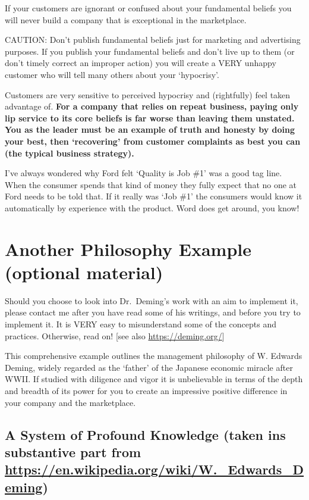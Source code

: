 \documentclass[
]{book}
\begin{document}
If your customers are ignorant or confused about your fundamental beliefs you will never build a company that is exceptional in the marketplace.

{CAUTION}: Don't publish fundamental beliefs just for marketing and advertising purposes. If you publish your fundamental beliefs and don't live up to them (or don't timely correct an improper action) you will create a VERY unhappy customer who will tell many others about your `hypocrisy'.

Customers are very sensitive to perceived hypocrisy and (rightfully) feel taken advantage of. \textbf{For a company that relies on repeat business, paying only lip service to its core beliefs is far worse than leaving them unstated. You as the leader must be an example of truth and honesty by doing your best, then `recovering' from customer complaints as best you can (the typical business strategy).}

I've always wondered why Ford felt `Quality is Job \#1' was a good tag line. When the consumer spends that kind of money they fully expect that no one at Ford needs to be told that. If it really was `Job \#1' the consumers would know it automatically by experience with the product. Word does get around, you know!

\hypertarget{another-philosophy-example-optional-material}{%
\section{Another Philosophy Example (optional material)}\label{another-philosophy-example-optional-material}}

Should you choose to look into Dr.~Deming's work with an aim to implement it, please contact me after you have read some of his writings, and before you try to implement it. It is VERY easy to misunderstand some of the concepts and practices. Otherwise, read on! {[}see also \url{https://deming.org/}{]}

This comprehensive example outlines the management philosophy of W. Edwards Deming, widely regarded as the `father' of the Japanese economic miracle after WWII. If studied with diligence and vigor it is unbelievable in terms of the depth and breadth of its power for you to create an impressive positive difference in your company and the marketplace.

\hypertarget{a-system-of-profound-knowledge-taken-ins-substantive-part-from-httpsen.wikipedia.orgwikiw._edwards_deming}{%
\subsection{\texorpdfstring{A System of Profound Knowledge (taken ins substantive part from \url{https://en.wikipedia.org/wiki/W._Edwards_Deming})}{A System of Profound Knowledge (taken ins substantive part from https://en.wikipedia.org/wiki/W.\_Edwards\_Deming)}}\label{a-system-of-profound-knowledge-taken-ins-substantive-part-from-httpsen.wikipedia.orgwikiw._edwards_deming}}
\end{document}
